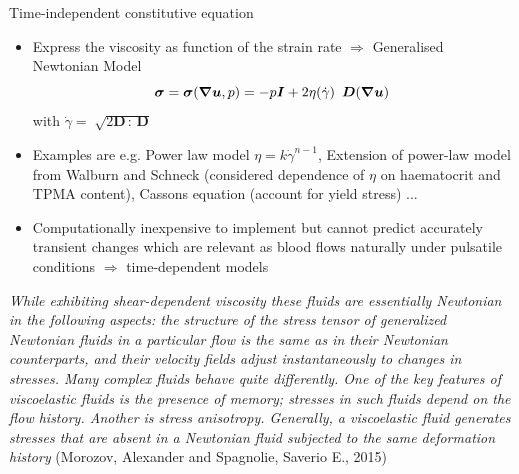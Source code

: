 \documentclass{beamer}
\begin{document}
	
		\begin{frame}{Time-independent constitutive equation }
		\begin{itemize}
			\item Express the viscosity
as function of the strain rate $\Rightarrow$ Generalised Newtonian Model 
			\begin{equation}
			    \bm{\sigma} = \bm{\sigma}(\grad\bm{u},p)= -p\bm{I} +2\eta(\Dot{\gamma})\hspace{5pt} \bm{D}(\grad\bm{u})
			\end{equation}
			with $\Dot{\gamma} = \sqrt[]{2\bm{D} \hspace{2pt}\bm{:} \hspace{2pt}\bm{D} }$
			\item Examples are e.g. Power law model $\eta= k\Dot{\gamma}^{n-1}$, Extension of power-law model from Walburn and Schneck (considered dependence of $\eta$
on haematocrit and TPMA content), Cassons equation (account for yield stress)  ...
			\item Computationally inexpensive to implement but cannot predict accurately
transient changes which are relevant as blood flows naturally under pulsatile conditions $\Rightarrow
$ time-dependent models
		\end{itemize}	
	\end{frame}


\begin{frame}
\textit{While exhibiting shear-dependent viscosity these fluids are essentially Newtonian in the following aspects: the structure of the stress tensor of generalized Newtonian fluids in a particular flow is the same as in their Newtonian counterparts, and their velocity fields adjust instantaneously to changes in stresses. Many complex fluids behave quite differently. One of the key features of viscoelastic fluids is the presence of memory; stresses in such fluids depend on the flow history. Another is stress anisotropy. Generally, a viscoelastic fluid generates stresses that are absent in a Newtonian fluid subjected to the same deformation history} (Morozov, Alexander and Spagnolie, Saverio E., 2015)
\end{frame}
\end{document}
